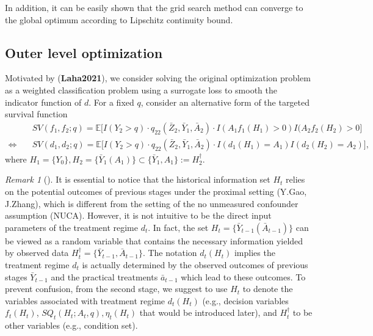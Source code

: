 \documentclass[10pt]{article}
\theoremstyle{remark} \newtheorem{rem}{Remark}
\begin{document}
In addition, it can be easily shown that the grid search method can converge to the global optimum according to Lipschitz continuity bound.


\subsection{Outer level optimization}
Motivated by (\textbf{Laha2021}), we consider solving the original optimization problem as a weighted classification problem using a surrogate loss to smooth the indicator function of $d$. 
For a fixed $q$, consider an alternative form of the targeted survival function 
\begin{align}
    &SV(f_1,f_2;q) = \mathbb{E} \big[I(Y_2 > q)\cdot q_{22}(\bar Z_{2}, \bar Y_{1}, \bar A_{2}) \cdot  I(A_1f_1(H_1)>0)I(A_2f_2(H_2)>0 \big] \\
    \Longleftrightarrow\quad & SV(d_1,d_2;q) = \mathbb{E} \big[I(Y_2 > q)\cdot q_{22}(\bar Z_{2}, \bar Y_{1}, \bar A_{2}) \cdot  I(d_1(H_1)=A_1)I(d_2(H_2)=A_2) \big],
\end{align}
where $H_1=\{Y_0\}, H_2=\{\bar Y_1(A_1)\} \subset \{\bar Y_1,A_1\}:= H_2^\dag$.
\begin{rem}[]
    It is essential to notice that the historical information set $H_t$ relies on the potential outcomes of previous stages under the proximal setting (Y.Gao, J.Zhang), which is different from the setting of the no unmeasured confounder assumption (NUCA).
    However, it is not intuitive to be the direct input parameters of the treatment regime $d_t$. 
    In fact, the set $H_t=\{\bar Y_{t-1}(\bar A_{t-1})\}$ can be viewed as a random variable that contains the necessary information yielded by observed data $H_t^\dag =\{\bar Y_{t-1}, \bar A_{t-1}\}$. 
    The notation $d_t(H_t)$ implies the treatment regime $d_t$ is actually determined by the observed outcomes of previous stages $\bar Y_{t-1}$ and the practical treatments $\bar a_{t-1}$ which lead to these outcomes.
    To prevent confusion, from the second stage, we suggest to use $H_t$ to denote the variables associated with treatment regime $d_t(H_t)$ (e.g., decision variables $f_t(H_t)$, $SQ_t(H_t; A_t,q),\eta_t(H_t)$ that would be introduced later), and $H_t^\dag$ to be other variables (e.g., condition set).
\end{rem}
\end{document}
